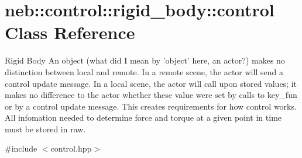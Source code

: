 \hypertarget{classneb_1_1control_1_1rigid__body_1_1control}{\section{neb\-:\-:control\-:\-:rigid\-\_\-body\-:\-:control \-Class \-Reference}
\label{classneb_1_1control_1_1rigid__body_1_1control}
}


\-Rigid \-Body \-An object (what did \-I mean by 'object' here, an actor?) makes no distinction between local and remote. \-In a remote scene, the actor will send a control update message. \-In a local scene, the actor will call upon stored values; it makes no difference to the actor whether these value were set by calls to key\-\_\-fun or by a control update message. \-This creates requirements for how control works. \-All infomation needed to determine force and torque at a given point in time must be stored in raw.  




{\ttfamily \#include $<$control.\-hpp$>$}

